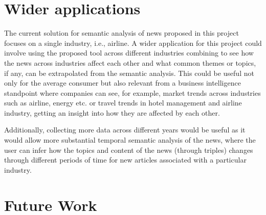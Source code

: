 

\section{Wider applications}
The current solution for semantic analysis of news proposed in this project focuses on a single industry, i.e., airline. A wider application for this project could involve using the proposed tool across different industries combining to see how the news across industries affect each other and what common themes or topics, if any, can be extrapolated from the semantic analysis. This could be useful not only for the average consumer but also relevant from a business intelligence standpoint where companies can see, for example, market trends across industries such as airline, energy etc. or travel trends in hotel management and airline industry, getting an insight into how they are affected by each other.

Additionally, collecting more data across different years would be useful as it would allow more substantial temporal semantic analysis of the news, where the user can infer how the topics and content of the news (through triples) changes through different periods of time for new articles associated with a particular industry. 



\section{Future Work}

